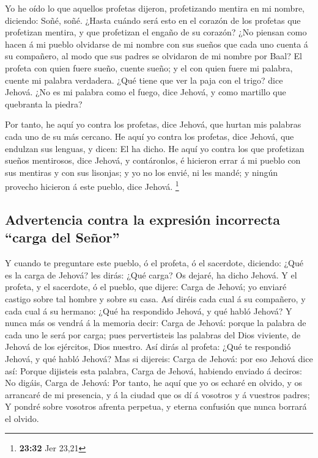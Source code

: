  Yo he oído lo que aquellos profetas dijeron,
profetizando mentira en mi nombre, diciendo: Soñé, soñé. 
¿Hasta cuándo será esto en el corazón de los profetas que profetizan
mentira, y que profetizan el engaño de su corazón?  ¿No
piensan como hacen á mi pueblo olvidarse de mi nombre con sus sueños que
cada uno cuenta á su compañero, al modo que sus padres se olvidaron de
mi nombre por Baal?  El profeta con quien fuere sueño,
cuente sueño; y el con quien fuere mi palabra, cuente mi palabra
verdadera. ¿Qué tiene que ver la paja con el trigo? dice Jehová.
 ¿No es mi palabra como el fuego, dice Jehová, y como
martillo que quebranta la piedra?

 Por tanto, he aquí yo contra los profetas, dice Jehová,
que hurtan mis palabras cada uno de su más cercano.  He
aquí yo contra los profetas, dice Jehová, que endulzan sus lenguas, y
dicen: El ha dicho.  He aquí yo contra los que profetizan
sueños mentirosos, dice Jehová, y contáronlos, é hicieron errar á mi
pueblo con sus mentiras y con sus lisonjas; y yo no los envié, ni les
mandé; y ningún provecho hicieron á este pueblo, dice Jehová.
\footnote{\textbf{23:32} Jer 23,21}

\hypertarget{advertencia-contra-la-expresiuxf3n-incorrecta-carga-del-seuxf1or}{%
\subsection{Advertencia contra la expresión incorrecta ``carga del
Señor''}\label{advertencia-contra-la-expresiuxf3n-incorrecta-carga-del-seuxf1or}}

 Y cuando te preguntare este pueblo, ó el profeta, ó el
sacerdote, diciendo: ¿Qué es la carga de Jehová? les dirás: ¿Qué carga?
Os dejaré, ha dicho Jehová.  Y el profeta, y el
sacerdote, ó el pueblo, que dijere: Carga de Jehová; yo enviaré castigo
sobre tal hombre y sobre su casa.  Así diréis cada cual á
su compañero, y cada cual á su hermano: ¿Qué ha respondido Jehová, y qué
habló Jehová?  Y nunca más os vendrá á la memoria decir:
Carga de Jehová: porque la palabra de cada uno le será por carga; pues
pervertisteis las palabras del Dios viviente, de Jehová de los
ejércitos, Dios nuestro.  Así dirás al profeta: ¿Qué te
respondió Jehová, y qué habló Jehová?  Mas si dijereis:
Carga de Jehová: por eso Jehová dice así: Porque dijisteis esta palabra,
Carga de Jehová, habiendo enviado á deciros: No digáis, Carga de Jehová:
 Por tanto, he aquí que yo os echaré en olvido, y os
arrancaré de mi presencia, y á la ciudad que os dí á vosotros y á
vuestros padres;  Y pondré sobre vosotros afrenta
perpetua, y eterna confusión que nunca borrará el olvido.

